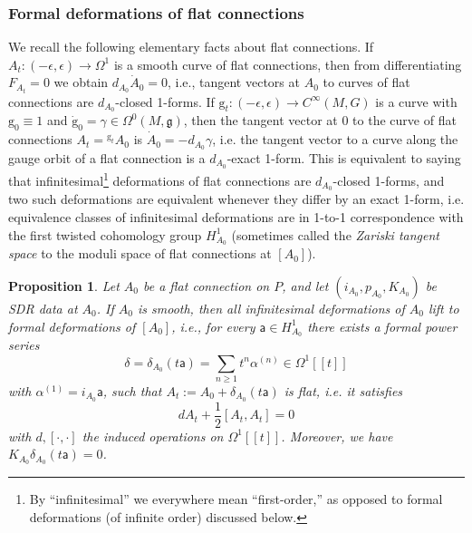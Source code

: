 \documentclass[11pt,a4paper]{amsart}
\theoremstyle{plain} %
\newtheorem{prop}[thm]{Proposition}
\theoremstyle{definition}
\theoremstyle{remark}
\newcommand{\g}{\mathfrak{g}}
\newcommand{\dd}{d}
\newcommand{\sfa}{\mathsf{a}}
\newcommand{\sfg}{\mathrm{g}} %
\begin{document}
 \subsubsection{Formal deformations of flat connections}
 We recall the following elementary facts about flat connections. If $A_t \colon (-\epsilon,\epsilon) \to \Omega^1$ is a smooth curve of flat connections, then from differentiating $F_{A_t} = 0$ we obtain $d_{A_0}\dot{A}_0 =0$, i.e., tangent vectors at $A_0$ to curves of flat connections are $d_{A_0}$-closed 1-forms. If $\sfg_t\colon (-\epsilon,\epsilon) \to C^\infty(M,G)$ is a curve with $\sfg_0 \equiv 1$ and 
 $\dot{\sfg}_0 = \gamma \in \Omega^0(M,
 \g)$, then the tangent vector at $0$ to the curve of flat connections $A_t = {}^{\sfg_t}A_0$ is $\dot{A}_0 = -d_{A_0}\gamma$, i.e. the tangent vector  {
 to a curve along the gauge orbit of a flat connection is a $d_{A_0}$-exact 1-form}. This is equivalent to saying that infinitesimal\footnote{ By ``infinitesimal'' we everywhere mean ``first-order,'' as opposed to formal deformations (of infinite order) discussed below.} deformations of flat connections are $d_{A_0}$-closed 1-forms, and two such deformations are equivalent whenever they differ by an exact 1-form, i.e. equivalence classes of infinitesimal deformations are in 1-to-1 correspondence with the first twisted cohomology group $H^1_{{A_0}}$ (sometimes called the \emph{Zariski tangent space} to the moduli space of flat connections at $[A_0]$). %
\begin{prop}\label{prop: deformation of A0}
Let $A_0$ be a flat connection on $P$, and let $(i_{A_0},p_{A_0},K_{A_0})$ be SDR %
data at $A_0$.  If $A_0$ is smooth, then all infinitesimal deformations of $A_0$ lift to formal deformations of $[A_0]$, i.e., for every $\sfa \in H^1_{A_0}$ there exists a formal power series 
\begin{equation}\delta = \delta_{A_0}(t\sfa) = \sum_{n\geq 1}t^n \alpha^{(n)} \in \Omega^1[[t]]\label{eq: formal delta}\end{equation}
with $\alpha^{(1)} = i_{A_0}\sfa$, such that $A_t:=A_0 + \delta_{A_0}(t\sfa)$ is flat, i.e. it satisfies $$\dd A_t + \frac12 [A_t,A_t] =0$$ with $\dd, [\cdot,\cdot]$ the induced operations on $\Omega^1[[t]]$. 
Moreover,  we have $K_{A_0}\delta_{A_0}(t\sfa) = 0$. 
\end{prop}
\end{document}
